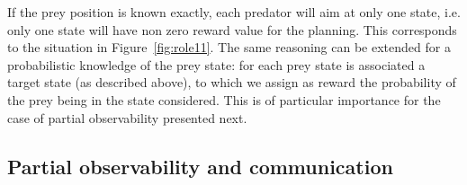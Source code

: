 
If the prey position is known exactly, each predator will aim at only one state, i.e. only one state will have non zero reward value for the planning. This corresponds to the situation in Figure~\ref{fig:role11}. The same reasoning can be extended for a probabilistic knowledge of the prey state: for each prey state is associated a target state (as described above), to which we assign as reward the probability of the prey being in the state considered. This is of particular importance for the case of partial observability presented next.

\subsection{Partial observability and communication}
\label{sec:com}

